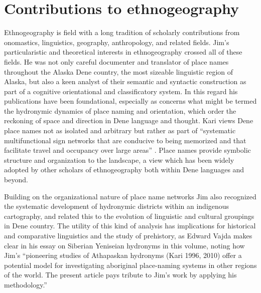 \section{Contributions to ethnogeography}
Ethnogeography is field with a long tradition of scholarly contributions from onomastics, linguistics, geography, anthropology, and related fields. Jim’s particularistic and theoretical interests in ethnogeography crossed all of these fields. He was not only careful documenter and translator of place names throughout the Alaska Dene country, the most sizeable linguistic region of Alaska, but also a keen analyst of their semantic and syntactic construction as part of a cognitive orientational and classificatory system. In this regard his publications have been foundational, especially as concerns what might be termed the hydronymic dynamics of place naming and orientation, which order the reckoning of space and direction in Dene language and thought. Kari views Dene place names not as isolated and arbitrary but rather as part of ``systematic multifunctional sign networks that are conducive to being memorized and that facilitate travel and occupancy over large areas'' \citeyearpar[444]{kari1996a}. Place names provide symbolic structure and organization to the landscape, a view which has been widely adopted by other scholars of ethnogeography both within Dene languages and beyond.

Building on the organizational nature of place name networks Jim also recognized the systematic development of hydronymic districts within an indigenous cartography, and related this to the evolution of linguistic and cultural groupings in Dene country. The utility of this kind of analysis has implications for historical and comparative linguistics and the study of prehistory, as Edward Vajda makes clear in his essay on Siberian Yeniseian hydronyms in this volume, noting how Jim’s “pioneering studies of Athapaskan hydronyms (Kari 1996, 2010) offer a potential model for investigating aboriginal place-naming systems in other regions of the world. The present article pays tribute to Jim’s work by applying his methodology.”

